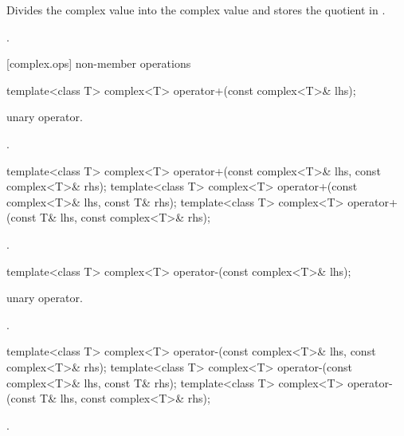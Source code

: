 \begin{itemdescr}
\pnum
\effects
Divides the complex value  into the complex value
and stores the quotient in
.

\pnum
\returns
{}.
\end{itemdescr}

[complex.ops]{ non-member operations}

%
\begin{itemdecl}
template<class T> complex<T> operator+(const complex<T>& lhs);
\end{itemdecl}

\begin{itemdescr}
\pnum
\remarks
unary operator.

\pnum
\returns
{}.
\end{itemdescr}

\begin{codeblock}
template<class T>
  complex<T> operator+(const complex<T>& lhs, const complex<T>& rhs);
template<class T> complex<T> operator+(const complex<T>& lhs, const T& rhs);
template<class T> complex<T> operator+(const T& lhs, const complex<T>& rhs);
\end{codeblock}

\begin{itemdescr}
\pnum
\returns
{}.
\end{itemdescr}

%
\begin{itemdecl}
template<class T> complex<T> operator-(const complex<T>& lhs);
\end{itemdecl}

\begin{itemdescr}
\pnum
\remarks
unary operator.

\pnum
\returns
{}.
\end{itemdescr}

%
\begin{itemdecl}
template<class T>
  complex<T> operator-(const complex<T>& lhs, const complex<T>& rhs);
template<class T> complex<T> operator-(const complex<T>& lhs, const T& rhs);
template<class T> complex<T> operator-(const T& lhs, const complex<T>& rhs);
\end{itemdecl}

\begin{itemdescr}
\pnum
\returns
{}.
\end{itemdescr}

